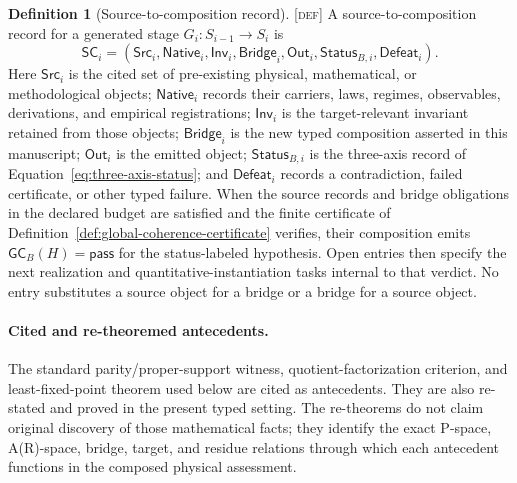 \documentclass[11pt]{article}
\newcommand{\Defn}{\textsc{[def]}}
\theoremstyle{definition}
\newtheorem{sdefinition}{Definition}
\begin{document}
\begin{sdefinition}[Source-to-composition record]
\label{def:source-to-composition-record}
\Defn{} A source-to-composition record for a generated stage $G_i:S_{i-1}\to S_i$
is
\begin{equation}
\mathsf{SC}_i=
\left(
\mathsf{Src}_i,\mathsf{Native}_i,\mathsf{Inv}_i,\mathsf{Bridge}_i,
\mathsf{Out}_i,\mathsf{Status}_{B,i},\mathsf{Defeat}_i
\right).
\label{eq:source-to-composition-record}
\end{equation}
Here $\mathsf{Src}_i$ is the cited set of pre-existing physical, mathematical, or
methodological objects; $\mathsf{Native}_i$ records their carriers, laws, regimes,
observables, derivations, and empirical registrations; $\mathsf{Inv}_i$ is the
target-relevant invariant retained from those objects; $\mathsf{Bridge}_i$ is the
new typed composition asserted in this manuscript; $\mathsf{Out}_i$ is the emitted
object; $\mathsf{Status}_{B,i}$ is the three-axis record of
Equation~\eqref{eq:three-axis-status}; and $\mathsf{Defeat}_i$ records a
contradiction, failed certificate, or other typed failure. When the source records and bridge obligations in the declared budget are
satisfied and the finite certificate of Definition~\ref{def:global-coherence-certificate}
verifies, their composition emits $\mathsf{GC}_{B}(H)=\mathsf{pass}$ for the
status-labeled hypothesis. Open entries then specify the next realization and
quantitative-instantiation tasks internal to that verdict. No entry substitutes a
source object for a bridge or a bridge for a source object.
\end{sdefinition}

\paragraph{Cited and re-theoremed antecedents.}
The standard parity/proper-support witness, quotient-factorization criterion, and
least-fixed-point theorem used below are cited as antecedents. They are also
re-stated and proved in the present typed setting. The re-theorems do not claim
original discovery of those mathematical facts; they identify the exact P-space,
A(R)-space, bridge, target, and residue relations through which each antecedent
functions in the composed physical assessment.
\end{document}
